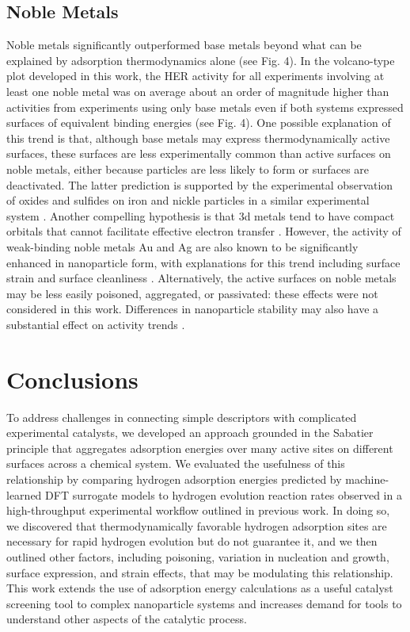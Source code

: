 \documentclass[preprint,12pt]{elsarticle}
\begin{document}
\subsection{Noble Metals}\label{Section:Results/Noble}
Noble metals significantly outperformed base metals beyond what can be explained by adsorption thermodynamics alone (see Fig. 4). In the volcano-type plot developed in this work, the HER activity for all experiments involving at least one noble metal was on average about an order of magnitude higher than activities from experiments using only base metals even if both systems expressed surfaces of equivalent binding energies (see Fig. 4). One possible explanation of this trend is that, although base metals may express thermodynamically active surfaces, these surfaces are less experimentally common than active surfaces on noble metals, either because particles are less likely to form or surfaces are deactivated. The latter prediction is supported by the experimental observation of oxides and sulfides on iron and nickle particles in a similar experimental system \cite{bhat2022accelerated}. Another compelling hypothesis is that 3d metals tend to have compact orbitals that cannot facilitate effective electron transfer \cite{quaino2014volcano}. However, the activity of weak-binding noble metals Au and Ag are also known to be significantly enhanced in nanoparticle form, with explanations for this trend including surface strain and surface cleanliness \cite{tran2018gold,campbell2009hydrogen,amin2014situ,merga2010naked,falsig2008trends}. Alternatively, the active surfaces on noble metals may be less easily poisoned, aggregated, or passivated: these effects were not considered in this work. Differences in nanoparticle stability may also have a substantial effect on activity trends \cite{simon2022ligand}.


\section{Conclusions}\label{Section:Conclusions}
To address challenges in connecting simple descriptors with complicated experimental catalysts, we developed an approach grounded in the Sabatier principle that aggregates adsorption energies over many active sites on different surfaces across a chemical system. We evaluated the usefulness of this relationship by comparing hydrogen adsorption energies predicted by machine-learned DFT surrogate models to hydrogen evolution reaction rates observed in a high-throughput experimental workflow outlined in previous work. In doing so, we discovered that thermodynamically favorable hydrogen adsorption sites are necessary for rapid hydrogen evolution but do not guarantee it, and we then outlined other factors, including poisoning, variation in nucleation and growth, surface expression, and strain effects, that may be modulating this relationship. This work extends the use of adsorption energy calculations as a useful catalyst screening tool to complex nanoparticle systems and increases demand for tools to understand other aspects of the catalytic process.
\end{document}
